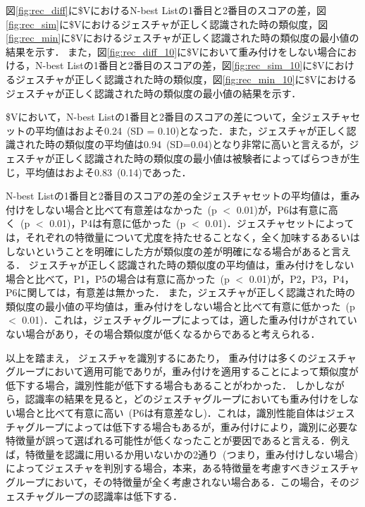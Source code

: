 図\ref{fig:rec_diff}に\$VにおけるN-best Listの1番目と2番目のスコアの差，図\ref{fig:rec_sim}に\$Vにおけるジェスチャが正しく認識された時の類似度，図\ref{fig:rec_min}に\$Vにおけるジェスチャが正しく認識された時の類似度の最小値の結果を示す．
また，図\ref{fig:rec_diff_10}に\$Vにおいて重み付けをしない場合における，N-best Listの1番目と2番目のスコアの差，図\ref{fig:rec_sim_10}に\$Vにおけるジェスチャが正しく認識された時の類似度，図\ref{fig:rec_min_10}に\$Vにおけるジェスチャが正しく認識された時の類似度の最小値の結果を示す．

\$Vにおいて，N-best Listの1番目と2番目のスコアの差について，全ジェスチャセットの平均値はおよそ0.24~(SD = 0.10)となった．また，ジェスチャが正しく認識された時の類似度の平均値は0.94~(SD=0.04)となり非常に高いと言えるが，ジェスチャが正しく認識された時の類似度の最小値は被験者によってばらつきが生じ，平均値はおよそ0.83~(0.14)であった．

N-best Listの1番目と2番目のスコアの差の全ジェスチャセットの平均値は，重み付けをしない場合と比べて有意差はなかった~(p $<$ 0.01)が，P6は有意に高く~(p $<$ 0.01)，P4は有意に低かった~(p $<$ 0.01)．ジェスチャセットによっては，それぞれの特徴量について尤度を持たせることなく，全く加味するあるいはしないということを明確にした方が類似度の差が明確になる場合があると言える．
ジェスチャが正しく認識された時の類似度の平均値は，重み付けをしない場合と比べて，P1，P5の場合は有意に高かった~(p $<$ 0.01)が，P2，P3，P4，P6に関しては，有意差は無かった．
また，ジェスチャが正しく認識された時の類似度の最小値の平均値は，重み付けをしない場合と比べて有意に低かった~(p $<$ 0.01)．これは，ジェスチャグループによっては，適した重み付けがされていない場合があり，その場合類似度が低くなるからであると考えられる．

以上を踏まえ，%
ジェスチャを識別するにあたり，
重み付けは多くのジェスチャグループにおいて適用可能でありが，重み付けを適用することによって類似度が低下する場合，識別性能が低下する場合もあることがわかった．
しかしながら，認識率の結果を見ると，どのジェスチャグループにおいても重み付けをしない場合と比べて有意に高い~(P6は有意差なし)．これは，識別性能自体はジェスチャグループによっては低下する場合もあるが，重み付けにより，識別に必要な特徴量が誤って選ばれる可能性が低くなったことが要因であると言える．例えば，特徴量を認識に用いるか用いないかの2通り~(つまり，重み付けしない場合)によってジェスチャを判別する場合，本来，ある特徴量を考慮すべきジェスチャグループにおいて，その特徴量が全く考慮されない場合ある．この場合，そのジェスチャグループの認識率は低下する．

